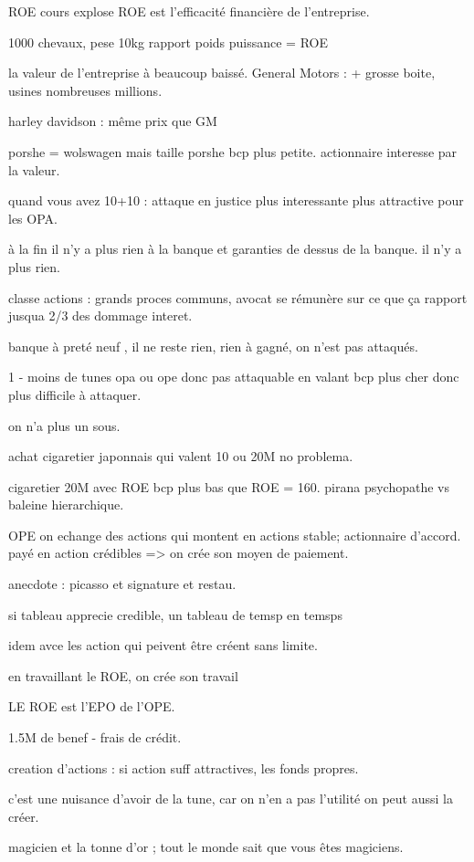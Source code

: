 \documentclass[a4paper,12pt]{article}
\begin{document}
ROE   cours explose
ROE est l'efficacité financière de l'entreprise.

1000 chevaux, pese 10kg    rapport poids puissance = ROE

la valeur de l'entreprise à beaucoup baissé.
General Motors : + grosse boite, usines nombreuses millions.

harley davidson : même prix que GM

porshe = wolswagen mais taille porshe bcp plus petite.
actionnaire interesse par la valeur.

quand vous avez 10+10 :
attaque en justice plus interessante
plus attractive pour les OPA.

à la fin il n'y a plus rien à la banque et garanties de dessus de la banque.
il n'y a plus rien.

classe actions : grands proces communs, avocat se rémunère sur ce que ça rapport jusqua 2/3 des dommage interet.

banque à preté neuf , il ne reste rien, rien à gagné, on n'est pas attaqués.

1 - moins de tunes opa ou ope donc pas attaquable en valant bcp plus cher donc plus difficile à attaquer.

on n'a plus un sous.

achat cigaretier japonnais qui valent 10 ou 20M no problema.

cigaretier 20M avec ROE bcp plus bas que ROE = 160.
pirana psychopathe vs baleine hierarchique.

OPE on echange des actions qui montent en actions stable; actionnaire d'accord.
payé en action crédibles => on crée son moyen de paiement.

anecdote : picasso et signature et restau.

si tableau apprecie credible, un tableau de temsp en temsps

idem avce les action qui peivent être créent sans limite.

en travaillant le ROE, on crée son travail

LE ROE est l'EPO de l'OPE.

1.5M de benef - frais de crédit.

creation d'actions : si action suff attractives, les fonds propres.

c'est une nuisance d'avoir de la tune, car on n'en a pas l'utilité on peut aussi la créer. 

magicien et la tonne d'or ; tout le monde sait que vous êtes magiciens.
\end{document}
